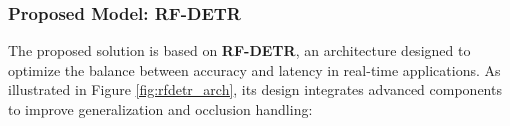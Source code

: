 \subsubsection{Proposed Model: RF-DETR}

The proposed solution is based on \textbf{RF-DETR}, an architecture designed to optimize the balance between accuracy and latency in real-time applications. As illustrated in Figure \ref{fig:rfdetr_arch}, its design integrates advanced components to improve generalization and occlusion handling:


